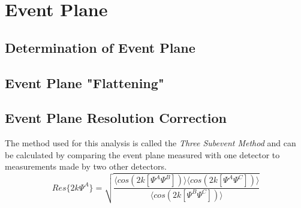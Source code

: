 
\chapter{Event Plane} %

\section{Determination of Event Plane}
\section{Event Plane "Flattening"}
\section{Event Plane Resolution Correction}
The method used for this analysis is called the \textit{Three Subevent Method} and can be calculated by comparing the event plane measured with one detector to measurements made by two other detectors.
\begin{equation}
Res\{2k \Psi^{A}\} = \sqrt{\frac{\langle cos(2k[\Psi^{A} \Psi^{B}])\rangle \langle cos(2k[\Psi^{A} \Psi^{C}])\rangle}{\langle cos(2k[\Psi^{B} \Psi^{C}])\rangle}}
\end{equation} 
\pagebreak
\pagebreak
